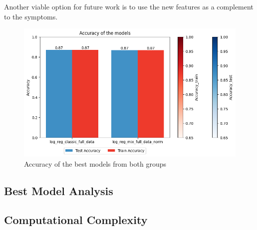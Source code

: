 Another viable option for future work is to use the new features as a complement to the symptoms.




\begin{figure}[H]
	\centering
	\includegraphics[width=\columnwidth]{images/acc_best_models.png}
	\caption{Accuracy of the best models from both groups}
	\label{fig:acc_best_models}
\end{figure}




\subsection{Best Model Analysis}



\subsection{Computational Complexity}



